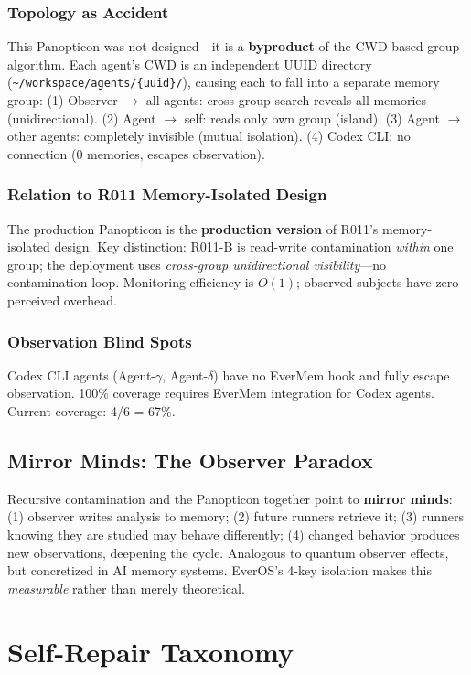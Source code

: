 \documentclass[11pt, a4paper]{article}
\begin{document}
\subsubsection{Topology as Accident}
This Panopticon was not designed---it is a \textbf{byproduct} of the CWD-based group algorithm. Each agent's CWD is an independent UUID directory (\texttt{\textasciitilde/workspace/agents/\{uuid\}/}), causing each to fall into a separate memory group: (1) Observer $\to$ all agents: cross-group search reveals all memories (unidirectional). (2) Agent $\to$ self: reads only own group (island). (3) Agent $\to$ other agents: completely invisible (mutual isolation). (4) Codex CLI: no connection (0 memories, escapes observation).

\subsubsection{Relation to R011 Memory-Isolated Design}
The production Panopticon is the \textbf{production version} of R011's memory-isolated design. Key distinction: R011-B is read-write contamination \textit{within} one group; the deployment uses \textit{cross-group unidirectional visibility}---no contamination loop. Monitoring efficiency is $O(1)$; observed subjects have zero perceived overhead.

\subsubsection{Observation Blind Spots}
Codex CLI agents (Agent-$\gamma$, Agent-$\delta$) have no EverMem hook and fully escape observation. 100\% coverage requires EverMem integration for Codex agents. Current coverage: 4/6 = 67\%.

\subsection{Mirror Minds: The Observer Paradox}

Recursive contamination and the Panopticon together point to \textbf{mirror minds}: (1) observer writes analysis to memory; (2) future runners retrieve it; (3) runners knowing they are studied may behave differently; (4) changed behavior produces new observations, deepening the cycle. Analogous to quantum observer effects, but concretized in AI memory systems. EverOS's 4-key isolation makes this \textit{measurable} rather than merely theoretical.

\section{Self-Repair Taxonomy}
\label{sec:self-repair}
\end{document}
